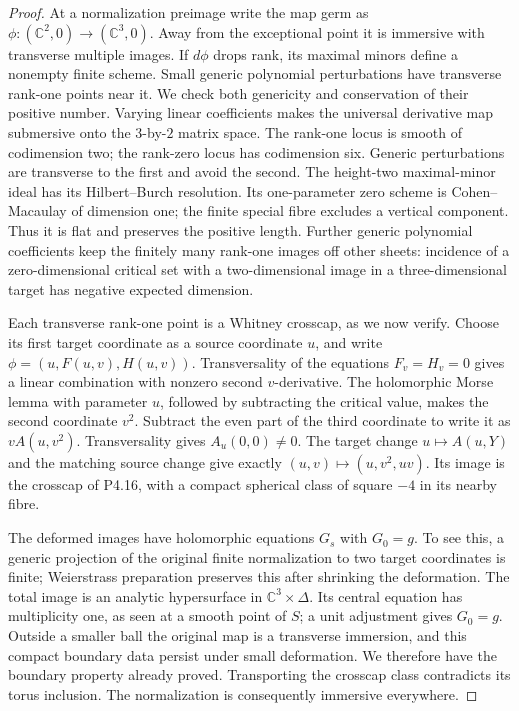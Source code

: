\begin{proof}
At a normalization preimage write the map germ as
$\phi:(\mathbb C^2,0)\to(\mathbb C^3,0)$. Away from the
exceptional point it is immersive with transverse multiple
images. If $d\phi$ drops rank, its maximal minors define a
nonempty finite scheme. Small generic polynomial
perturbations have transverse rank-one points near it.
We check both genericity and conservation of their positive
number. Varying linear coefficients makes the universal
derivative map submersive onto the $3$-by-$2$ matrix space.
The rank-one locus is smooth of codimension two; the rank-zero
locus has codimension six. Generic perturbations are transverse
to the first and avoid the second. The height-two maximal-minor
ideal has its Hilbert--Burch resolution. Its one-parameter
zero scheme is Cohen--Macaulay of dimension one; the finite
special fibre excludes a vertical component. Thus it is flat
and preserves the positive length. Further generic polynomial
coefficients keep the finitely many rank-one images off other
sheets: incidence of a zero-dimensional critical set with a
two-dimensional image in a three-dimensional target has
negative expected dimension.

Each transverse rank-one point is a Whitney crosscap, as we
now verify. Choose its first target coordinate as a source
coordinate $u$, and write $\phi=(u,F(u,v),H(u,v))$.
Transversality of the equations $F_v=H_v=0$ gives a linear
combination with nonzero second $v$-derivative. The
holomorphic Morse lemma with parameter $u$, followed by
subtracting the critical value, makes the second coordinate
$v^2$. Subtract the even part of the third coordinate to
write it as $vA(u,v^2)$. Transversality gives $A_u(0,0)\ne0$.
The target change $u\mapsto A(u,Y)$ and the matching source
change give exactly $(u,v)\mapsto(u,v^2,uv)$.
Its image is the crosscap of P4.16, with a compact spherical
class of square $-4$ in its nearby fibre.

The deformed images have holomorphic equations $G_s$ with
$G_0=g$. To see this, a generic projection of the original
finite normalization to two target coordinates is finite;
Weierstrass preparation preserves this after shrinking the
deformation. The total image is an analytic hypersurface
in $\mathbb C^3\times\Delta$. Its central equation has
multiplicity one, as seen at a smooth point of $S$; a unit
adjustment gives $G_0=g$. Outside a smaller ball the original
map is a transverse immersion, and this compact boundary
data persist under small deformation. We therefore have
the boundary property already proved. Transporting the
crosscap class contradicts its torus inclusion. The
normalization is consequently immersive everywhere.


\end{proof}
